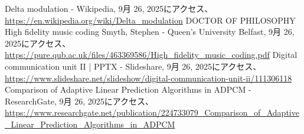 \documentclass[
  a4paper,  %
  11pt,     %
]{ltjsarticle}%
\begin{document}
\begin{thebibliography}{99}
 Delta modulation - Wikipedia, 9月 26, 2025にアクセス、 \url{https://en.wikipedia.org/wiki/Delta_modulation}
 DOCTOR OF PHILOSOPHY High fidelity music coding Smyth, Stephen - Queen's University Belfast, 9月 26, 2025にアクセス、 \url{https://pure.qub.ac.uk/files/463369586/High_fidelity_music_coding.pdf}
 Digital communication unit II | PPTX - Slideshare, 9月 26, 2025にアクセス、 \url{https://www.slideshare.net/slideshow/digital-communication-unit-ii/111306118}
 Comparison of Adaptive Linear Prediction Algorithms in ADPCM - ResearchGate, 9月 26, 2025にアクセス、 \url{https://www.researchgate.net/publication/224733079_Comparison_of_Adaptive_Linear_Prediction_Algorithms_in_ADPCM}
\end{thebibliography}
\end{document}
